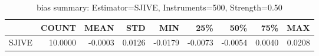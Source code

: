 \begin{table}[ht]
\centering
\caption{bias summary: Estimator=SJIVE, Instruments=500, Strength=0.50}
\begin{tabular}{lrrrrrrrr}
\toprule
 & COUNT & MEAN & STD & MIN & 25\% & 50\% & 75\% & MAX \\
\midrule
SJIVE & 10.0000 & -0.0003 & 0.0126 & -0.0179 & -0.0073 & -0.0054 & 0.0040 & 0.0208 \\
\bottomrule
\end{tabular}
\end{table}
